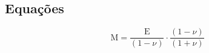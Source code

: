 \documentclass[a4paper, 12pt]{article}
\begin{document}
	
	\subsection{Equações}
		
	\begin{equation}\label{main_eq}
		\textrm{M}=\dfrac{\textrm{E}}{(1-\nu)}\cdot\dfrac{(1-\nu)}{(1+\nu)}
	\end{equation}
\end{document}
